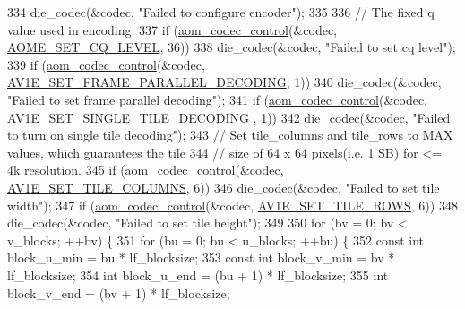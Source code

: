 \begin{DoxyCodeInclude}
{{{{{{{334     die\_codec(&codec, \textcolor{stringliteral}{"Failed to configure encoder"});
335 
336   \textcolor{comment}{// The fixed q value used in encoding.}
337   \textcolor{keywordflow}{if} (\hyperlink{group__codec_ga6da974f4eeaba1fa74106b28d0fe6ac5}{aom\_codec\_control}(&codec, \hyperlink{group__aom__encoder_ggae78dde67a6d78f332e9bdba0dde42db5af67f265bf63bf8f1268b3a14ae26606c}{AOME\_SET\_CQ\_LEVEL}, 36))
338     die\_codec(&codec, \textcolor{stringliteral}{"Failed to set cq level"});
339   \textcolor{keywordflow}{if} (\hyperlink{group__codec_ga6da974f4eeaba1fa74106b28d0fe6ac5}{aom\_codec\_control}(&codec, 
      \hyperlink{group__aom__encoder_ggae78dde67a6d78f332e9bdba0dde42db5a465382b6bbca24467739c3c1b94e6483}{AV1E\_SET\_FRAME\_PARALLEL\_DECODING}, 1))
340     die\_codec(&codec, \textcolor{stringliteral}{"Failed to set frame parallel decoding"});
341   \textcolor{keywordflow}{if} (\hyperlink{group__codec_ga6da974f4eeaba1fa74106b28d0fe6ac5}{aom\_codec\_control}(&codec, \hyperlink{group__aom__encoder_ggae78dde67a6d78f332e9bdba0dde42db5af341538631ffe2ac2b562c8b5336a10a}{AV1E\_SET\_SINGLE\_TILE\_DECODING}
      , 1))
342     die\_codec(&codec, \textcolor{stringliteral}{"Failed to turn on single tile decoding"});
343   \textcolor{comment}{// Set tile\_columns and tile\_rows to MAX values, which guarantees the tile}
344   \textcolor{comment}{// size of 64 x 64 pixels(i.e. 1 SB) for <= 4k resolution.}
345   \textcolor{keywordflow}{if} (\hyperlink{group__codec_ga6da974f4eeaba1fa74106b28d0fe6ac5}{aom\_codec\_control}(&codec, \hyperlink{group__aom__encoder_ggae78dde67a6d78f332e9bdba0dde42db5acf4ab1ff2fa8d76a78881ad7f1a1294d}{AV1E\_SET\_TILE\_COLUMNS}, 6))
346     die\_codec(&codec, \textcolor{stringliteral}{"Failed to set tile width"});
347   \textcolor{keywordflow}{if} (\hyperlink{group__codec_ga6da974f4eeaba1fa74106b28d0fe6ac5}{aom\_codec\_control}(&codec, \hyperlink{group__aom__encoder_ggae78dde67a6d78f332e9bdba0dde42db5a57f2f2a54f593b398a5e97db7982f817}{AV1E\_SET\_TILE\_ROWS}, 6))
348     die\_codec(&codec, \textcolor{stringliteral}{"Failed to set tile height"});
349 
350   \textcolor{keywordflow}{for} (bv = 0; bv < v\_blocks; ++bv) \{
351     \textcolor{keywordflow}{for} (bu = 0; bu < u\_blocks; ++bu) \{
352       \textcolor{keyword}{const} \textcolor{keywordtype}{int} block\_u\_min = bu * lf\_blocksize;
353       \textcolor{keyword}{const} \textcolor{keywordtype}{int} block\_v\_min = bv * lf\_blocksize;
354       \textcolor{keywordtype}{int} block\_u\_end = (bu + 1) * lf\_blocksize;
355       \textcolor{keywordtype}{int} block\_v\_end = (bv + 1) * lf\_blocksize;
}}}}}}}
\end{DoxyCodeInclude}
